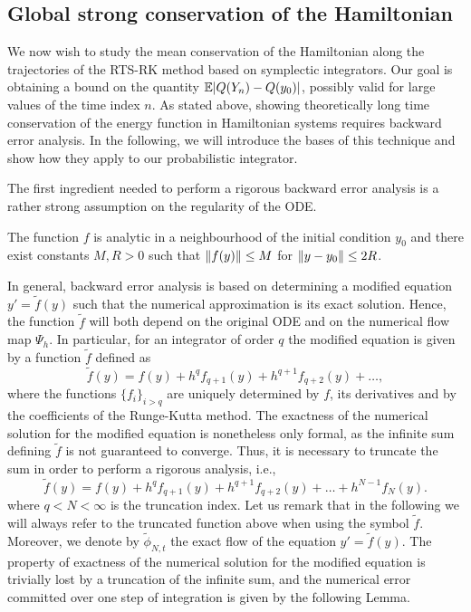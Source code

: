 \documentclass[final,onefignum,onetabnum]{siamonline171218}
\begin{document}
\subsection{Global strong conservation of the Hamiltonian} We now wish to study the mean conservation of the Hamiltonian along the trajectories of the RTS-RK method based on symplectic integrators. Our goal is obtaining a bound on the quantity $\operatorname{\mathbb{E}}\lvert Q(Y_n) - Q(y_0)\rvert$, possibly valid for large values of the time index $n$. As stated above, showing theoretically long time conservation of the energy function in Hamiltonian systems requires backward error analysis. In the following, we will introduce the bases of this technique and show how they apply to our probabilistic integrator. 

The first ingredient needed to perform a rigorous backward error analysis is a rather strong assumption on the regularity of the ODE.
\begin{assumption}\label{as:RegHamiltonian} The function $f$ is analytic in a neighbourhood of the initial condition $y_0$ and there exist constants $M, R > 0$ such that $\lVert f(y)\rVert \leq M$ for $\lVert y - y_0\rVert \leq 2R$.
\end{assumption}
In general, backward error analysis is based on determining a modified equation $y' = \tilde f(y)$ such that the numerical approximation is its exact solution. Hence, the function $\tilde f$ will both depend on the original ODE and on the numerical flow map $\Psi_h$. In particular, for an integrator of order $q$ the modified equation is given by a function $\tilde f$ defined as
\begin{equation}
\tilde f(y) = f(y) + h^q f_{q+1}(y) + h^{q+1} f_{q+2}(y) + \ldots,
\end{equation}
where the functions $\{f_i\}_{i>q}$ are uniquely determined by $f$, its derivatives and by the coefficients of the Runge-Kutta method. The exactness of the numerical solution for the modified equation is nonetheless only formal, as the infinite sum defining $\tilde f$ is not guaranteed to converge. Thus, it is necessary to truncate the sum in order to perform a rigorous analysis, i.e.,
\begin{equation}
\tilde f(y) = f(y) + h^q f_{q+1}(y) + h^{q+1} f_{q+2}(y) + \ldots + h^{N-1}f_N(y).
\end{equation}
where $q < N < \infty$ is the truncation index. Let us remark that in the following we will always refer to the truncated function above when using the symbol $\tilde f$. Moreover, we denote by $\tilde \phi_{N, t}$ the exact flow of the equation $y' = \tilde f(y)$. The property of exactness of the numerical solution for the modified equation is trivially lost by a truncation of the infinite sum, and the numerical error committed over one step of integration is given by the following Lemma.
\end{document}
